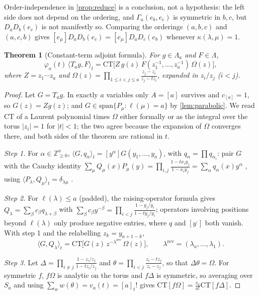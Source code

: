 \documentclass[11pt]{amsart}
\newtheorem{theorem}{Theorem}[section]
\theoremstyle{definition}
\theoremstyle{remark}
\numberwithin{equation}{section}
\newcommand{\Lam}{\Lambda}
\begin{document}
Order-independence in \cref{prop:reduce} is a conclusion, not a hypothesis: the left side does not depend on the ordering, and $\Gamma_a(e_b,e_c)$ is symmetric in $b,c$, but $D_aD_b(e_c)$ is not manifestly so. Comparing the orderings $(a,b,c)$ and $(a,c,b)$ gives $[e_\mu]D_aD_b(e_c)=[e_\mu]D_aD_c(e_b)$ whenever $\kappa(\lambda,\mu)=1$.

\begin{theorem}[Constant-term adjoint formula]\label{thm:CT}
For $g\in\Lam_a$ and $F\in\Lam$,\[ \varphi_a(t)\,\langle T_ag,F\rangle_t=\mathrm{CT}\bigl[Z\,g(z)\,F(z_1^{-1},\dots,z_a^{-1})\,\Omega(z)\bigr], \]where $Z=z_1\cdots z_a$ and $\Omega(z)=\prod_{1\le i<j\le a}\frac{z_j-z_i}{z_j-tz_i}$, expanded in $z_i/z_j$ ($i<j$).
\end{theorem}
\begin{proof}
Let $G=T_ag$. In exactly $a$ variables only $A=[a]$ survives and $c_{[a]}=1$, so $G(z)=Zg(z)$; and $G\in\mathrm{span}\{P_\mu:\ell(\mu)=a\}$ by \cref{lem:parabolic}. We read $\mathrm{CT}$ of a Laurent polynomial times $\Omega$ either formally or as the integral over the torus $|z_i|=1$ for $|t|<1$; the two agree because the expansion of $\Omega$ converges there, and both sides of the theorem are rational in $t$.

\emph{Step 1.} For $\alpha\in\mathbb{Z}^a_{\ge0}$, $\langle G,q_\alpha\rangle_t=[y^\alpha]G(y_1,\dots,y_a)$, with $q_\alpha=\prod q_{\alpha_i}$: pair $G$ with the Cauchy identity $\sum_\mu Q_\mu(x)P_\mu(y)=\prod_{i,j}\frac{1-tx_iy_j}{1-x_iy_j}=\sum_\alpha q_\alpha(x)y^\alpha$ \cite[III (4.2), (4.4)]{Macdonald95}, using $\langle P_\lambda,Q_\mu\rangle_t=\delta_{\lambda\mu}$ \cite[III (4.9)]{Macdonald95}.

\emph{Step 2.} For $\ell(\lambda)\le a$ (padded), the raising-operator formula \cite[III (2.15$'$)]{Macdonald95} gives $Q_\lambda=\sum_\beta c_\beta q_{\lambda+\beta}$ with $\sum_\beta c_\beta y^{-\beta}=\prod_{i<j}\frac{1-y_j/y_i}{1-ty_j/y_i}$; operators involving positions beyond $\ell(\lambda)$ only produce negative entries, where $q$ and $[y^\cdot]$ both vanish. With step 1 and the relabelling $z_k=y_{a+1-k}$,
\[ \langle G,Q_\lambda\rangle_t=\mathrm{CT}\bigl[G(z)\,z^{-\lambda^{\mathrm{rev}}}\,\Omega(z)\bigr],\qquad\lambda^{\mathrm{rev}}=(\lambda_a,\dots,\lambda_1). \]

\emph{Step 3.} Let $\Delta=\prod_{i\ne j}\frac{1-z_i/z_j}{1-tz_i/z_j}$ and $\theta=\prod_{i<j}\frac{z_i-tz_j}{z_i-z_j}$, so that $\Delta\theta=\Omega$. For symmetric $f$, $f\Omega$ is analytic on the torus and $f\Delta$ is symmetric, so averaging over $S_a$ and using $\sum_ww(\theta)=v_a(t)=[a]_t!$ \cite[III (1.4)]{Macdonald95} gives $\mathrm{CT}[f\Omega]=\frac{v_a}{a!}\mathrm{CT}[f\Delta]$.


\end{proof}
\end{document}
